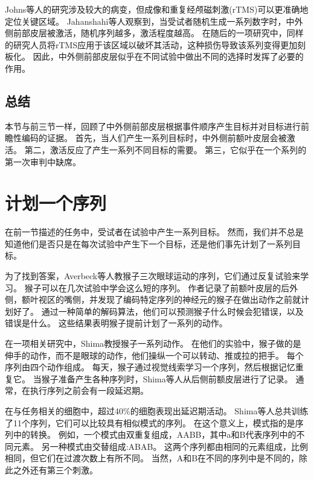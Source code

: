 Johns等人的研究涉及较大的病变，但成像和重复经颅磁刺激(rTMS)可以更准确地定位关键区域。
Jahanshahi等人\cite{jahanshahi2000role}观察到，当受试者随机生成一系列数字时，中外侧前部皮层被激活，随机序列越多，激活程度越高。
在随后的一项研究中\cite{jahanshahi1998left}，同样的研究人员将rTMS应用于该区域以破坏其活动，这种损伤导致该系列变得更加刻板化。
因此，中外侧前部皮层似乎在不同试验中做出不同的选择时发挥了必要的作用。



\subsection{总结}

本节与前三节一样，回顾了中外侧前部皮层根据事件顺序产生目标并对目标进行前瞻性编码的证据。
首先，当人们产生一系列目标时，中外侧前额叶皮层会被激活。
第二，激活反应了产生一系列不同目标的需要。
第三，它似乎在一个系列的第一次审判中缺席。



\section{计划一个序列}

在前一节描述的任务中，受试者在试验中产生一系列目标。
然而，我们并不总是知道他们是否只是在每次试验中产生下一个目标，还是他们事先计划了一系列目标。


为了找到答案，Averbeck等人\cite{averbeck2006activity}教猴子三次眼球运动的序列，它们通过反复试验来学习。
猴子可以在几次试验中学会这么短的序列。
作者记录了前额叶皮层的后外侧，额叶视区的嘴侧，并发现了编码特定序列的神经元的猴子在做出动作之前就计划好了。
通过一种简单的解码算法，他们可以预测猴子什么时候会犯错误，以及错误是什么。
这些结果表明猴子提前计划了一系列的动作。


在一项相关研究中，Shima\cite{shima2007categorization}教授猴子一系列动作。
在他们的实验中，猴子做的是伸手的动作，而不是眼球的动作，他们操纵一个可以转动、推或拉的把手。
每个序列由四个动作组成。
每天，猴子通过视觉线索学习一个序列，然后根据记忆重复它。
当猴子准备产生各种序列时，Shima等人从后侧前额皮层进行了记录。
通常，在执行序列之前会有一段延迟期。


在与任务相关的细胞中，超过40\%的细胞表现出延迟期活动。
Shima等人\cite{shima2007categorization}总共训练了11个序列，它们可以比较具有相似模式的序列。
在这个意义上，模式指的是序列中的转换。
例如，一个模式由双重复组成，AABB，其中a和B代表序列中的不同元素。
另一种模式由交替组成:ABAB。
这两个序列都由相同的元素组成，比例相同，但它们在过渡次数上有所不同。
当然，A和B在不同的序列中是不同的，除此之外还有第三个刺激。


